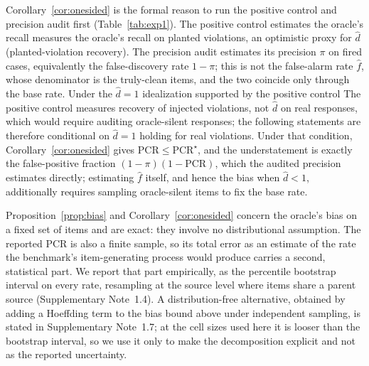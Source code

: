 \documentclass[pdflatex,sn-nature]{sn-jnl}
\newcommand{\rev}[1]{#1} %
\newcommand{\rev}[1]{{\color{blue}#1}} %
\providecommand{\DIFadd}[1]{{\protect\color{blue} \sf #1}} %
\providecommand{\DIFdel}[1]{{\protect\color{red} \scriptsize #1}} %
\providecommand{\DIFaddbegin}{} %
\providecommand{\DIFaddend}{} %
\providecommand{\DIFdelbegin}{} %
\providecommand{\DIFdelend}{} %
\providecommand{\DIFscaledelfig}{0.5}
\newlength{\DIFdelgraphicswidth} %
\newlength{\DIFdelgraphicsheight} %
\providecommand{\DIFaddincludegraphics}[2][]{{\color{blue}\fbox{\DIFOincludegraphics[#1]{#2}}}} %
\providecommand{\DIFdelincludegraphics}[2][]{%
\sbox{\DIFdelgraphicsbox}{\DIFOincludegraphics[#1]{#2}}%
\settoboxwidth{\DIFdelgraphicswidth}{\DIFdelgraphicsbox} %
\settoboxtotalheight{\DIFdelgraphicsheight}{\DIFdelgraphicsbox} %
\scalebox{\DIFscaledelfig}{%
\parbox[b]{\DIFdelgraphicswidth}{\usebox{\DIFdelgraphicsbox}\\[-\baselineskip] \rule{\DIFdelgraphicswidth}{0em}}\llap{\resizebox{\DIFdelgraphicswidth}{\DIFdelgraphicsheight}{%
\setlength{\unitlength}{\DIFdelgraphicswidth}%
\begin{picture}(1,1)%
\thicklines\linethickness{2pt} %
{\color[rgb]{1,0,0}\put(0,0){\framebox(1,1){}}}%
{\color[rgb]{1,0,0}\put(0,0){\line( 1,1){1}}}%
{\color[rgb]{1,0,0}\put(0,1){\line(1,-1){1}}}%
\end{picture}%
}\hspace*{3pt}}} %
} %
\DeclareRobustCommand{\DIFaddbegin}{\DIFOaddbegin \let\includegraphics\DIFaddincludegraphics} %
\DeclareRobustCommand{\DIFaddend}{\DIFOaddend \let\includegraphics\DIFOincludegraphics} %
\DeclareRobustCommand{\DIFdelbegin}{\DIFOdelbegin \let\includegraphics\DIFdelincludegraphics} %
\DeclareRobustCommand{\DIFdelend}{\DIFOaddend \let\includegraphics\DIFOincludegraphics} %
\begin{document}
\noindent Corollary~\ref{cor:onesided} is the formal reason to run the positive control
and precision audit first (Table~\ref{tab:exp1}). The positive control \DIFdelbegin \DIFdel{estimates the
oracle's recall }\DIFdelend \DIFaddbegin \DIFadd{\rev{measures the
oracle's recall on planted violations, an optimistic proxy for} }\DIFaddend $\hat d$\DIFdelbegin \DIFdel{(planted-violation recovery)}\DIFdelend . The precision audit estimates its
precision $\pi$ on fired cases, equivalently the false-discovery rate $1-\pi$; this is not
the false-alarm rate $\hat f$, whose denominator is the truly-clean items, and the two
coincide only through the base rate. \DIFdelbegin \DIFdel{Under the $\hat d=1$ idealization supported by the
positive control}\DIFdelend \DIFaddbegin \DIFadd{\rev{The positive control measures recovery of injected
violations, not $\hat d$ on real responses, which would require auditing oracle-silent responses;
the following statements are therefore conditional on $\hat d=1$ holding for real violations.}
Under \rev{that condition}}\DIFaddend , Corollary~\ref{cor:onesided} gives $\mathrm{PCR}\le\mathrm{PCR}^\star$,
and the understatement is exactly the false-positive fraction $(1-\pi)(1-\mathrm{PCR})$, which the
audited precision estimates directly; estimating $\hat f$ itself, and hence the bias when
$\hat d<1$, additionally requires sampling oracle-silent items to fix the base rate.

Proposition~\ref{prop:bias} and Corollary~\ref{cor:onesided} concern the oracle's bias on
a fixed set of items and are exact: they involve no distributional assumption. The reported
PCR is also a finite sample, so its total error as an estimate of the rate the benchmark's
item-generating process would produce carries a second, statistical part. We report that part
empirically, as the percentile bootstrap interval on every rate, resampling at the source
level where items share a parent source (Supplementary Note~1.4). A distribution-free
alternative, obtained by adding a Hoeffding term to the bias bound above under independent
sampling, is stated in Supplementary Note~1.7; at the cell sizes used here it is looser than
the bootstrap interval, so we use it only to make the decomposition explicit and not as the
reported uncertainty.
\end{document}

